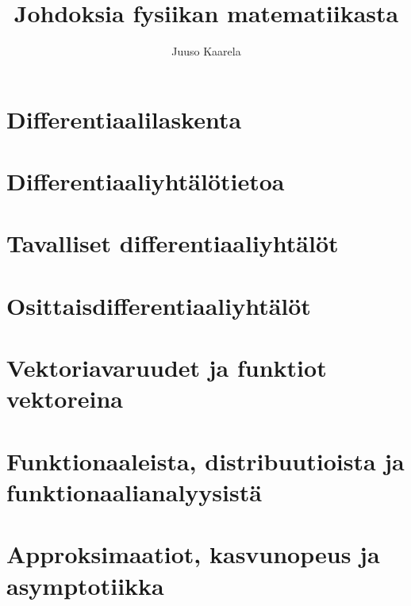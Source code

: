 \documentclass{article}%
\title{Johdoksia fysiikan matematiikasta}%
\author{Juuso Kaarela}%
\date{}
\numberwithin{equation}{section}
\numberwithin{figure}{section}
\numberwithin{table}{section}
\begin{document}
%
\normalsize%
\maketitle%

\tableofcontents

\pagebreak

\section{Differentiaalilaskenta}%
\label{sec:diff}%



\pagebreak
%
\section{Differentiaaliyhtälötietoa}
\label{sec:difftie}



\pagebreak

%
\section{Tavalliset differentiaaliyhtälöt}%
\label{sec:tdy}%



\pagebreak

%
\section{Osittaisdifferentiaaliyhtälöt}%
\label{sec:ody}



\pagebreak

\section{Vektoriavaruudet ja funktiot vektoreina}
\label{sec:vekt}



\pagebreak

\section{Funktionaaleista, distribuutioista ja funktionaalianalyysistä}%
\label{sec:funk}



\pagebreak

\section{Approksimaatiot, kasvunopeus ja asymptotiikka}
\label{sec:approks}



%
\end{document}
